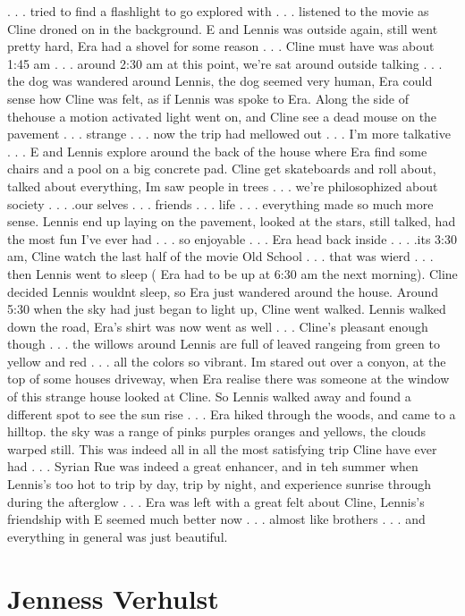 \documentclass[12pt]{book}
\begin{document}
. . .  tried to find a flashlight to go explored with . . .  listened to the movie as Cline droned on in the background. E and Lennis was outside again, still went pretty hard, Era had a shovel for some reason . . .  Cline must have was about 1:45 am . . .  around 2:30 am at this point, we're sat around outside talking . . .  the dog was wandered around Lennis, the dog seemed very human, Era could sense how Cline was felt, as if Lennis was spoke to Era. Along the side of thehouse a motion activated light went on, and Cline see a dead mouse on the pavement . . .  strange . . .  now the trip had mellowed out . . .  I'm more talkative . . .  E and Lennis explore around the back of the house where Era find some chairs and a pool on a big concrete pad. Cline get skateboards and roll about, talked about everything, Im saw people in trees . . .  we're philosophized about society . . .  .our selves . . .  friends . . .  life . . .  everything made so much more sense. Lennis end up laying on the pavement, looked at the stars, still talked, had the most fun I've ever had . . .  so enjoyable . . .  Era head back inside . . .  .its 3:30 am, Cline watch the last half of the movie Old School . . .  that was wierd . . .  then Lennis went to sleep ( Era had to be up at 6:30 am the next morning). Cline decided Lennis wouldnt sleep, so Era just wandered around the house. Around 5:30 when the sky had just began to light up, Cline went walked. Lennis walked down the road, Era's shirt was now went as well . . .  Cline's pleasant enough though . . .  the willows around Lennis are full of leaved rangeing from green to yellow and red . . .  all the colors so vibrant. Im stared out over a conyon, at the top of some houses driveway, when Era realise there was someone at the window of this strange house looked at Cline. So Lennis walked away and found a different spot to see the sun rise . . .  Era hiked through the woods, and came to a hilltop. the sky was a range of pinks purples oranges and yellows, the clouds warped still. This was indeed all in all the most satisfying trip Cline have ever had . . .  Syrian Rue was indeed a great enhancer, and in teh summer when Lennis's too hot to trip by day, trip by night, and experience sunrise through during the afterglow . . .  Era was left with a great felt about Cline, Lennis's friendship with E seemed much better now . . .  almost like brothers . . .  and everything in general was just beautiful.



\chapter{Jenness Verhulst}
\end{document}

